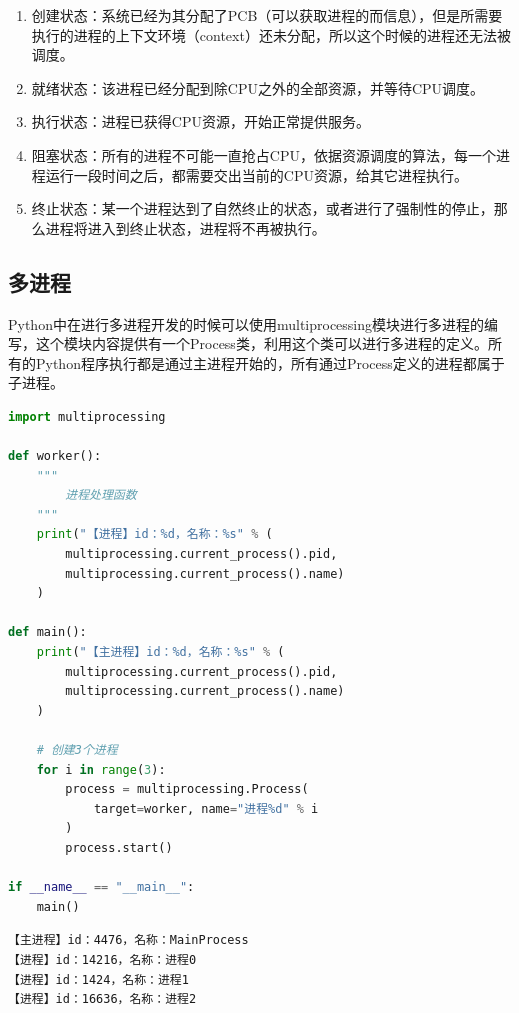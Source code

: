 \begin{enumerate}
    \item 创建状态：系统已经为其分配了PCB（可以获取进程的而信息），但是所需要执行的进程的上下文环境（context）还未分配，所以这个时候的进程还无法被调度。

    \item 就绪状态：该进程已经分配到除CPU之外的全部资源，并等待CPU调度。

    \item 执行状态：进程已获得CPU资源，开始正常提供服务。

    \item 阻塞状态：所有的进程不可能一直抢占CPU，依据资源调度的算法，每一个进程运行一段时间之后，都需要交出当前的CPU资源，给其它进程执行。

    \item 终止状态：某一个进程达到了自然终止的状态，或者进行了强制性的停止，那么进程将进入到终止状态，进程将不再被执行。
\end{enumerate}

\vspace{0.5cm}

\subsection{多进程}

Python中在进行多进程开发的时候可以使用multiprocessing模块进行多进程的编写，这个模块内容提供有一个Process类，利用这个类可以进行多进程的定义。所有的Python程序执行都是通过主进程开始的，所有通过Process定义的进程都属于子进程。\\


\begin{lstlisting}[language=Python]
import multiprocessing

def worker():
	"""
		进程处理函数
	"""
	print("【进程】id：%d，名称：%s" % (
		multiprocessing.current_process().pid,
		multiprocessing.current_process().name)
	)

def main():
	print("【主进程】id：%d，名称：%s" % (
		multiprocessing.current_process().pid,
		multiprocessing.current_process().name)
	)

	# 创建3个进程
	for i in range(3):
		process = multiprocessing.Process(
			target=worker, name="进程%d" % i
		)
		process.start()

if __name__ == "__main__":
	main()
\end{lstlisting}

\begin{tcolorbox}
    \begin{verbatim}
【主进程】id：4476，名称：MainProcess
【进程】id：14216，名称：进程0
【进程】id：1424，名称：进程1
【进程】id：16636，名称：进程2
	\end{verbatim}
\end{tcolorbox}

